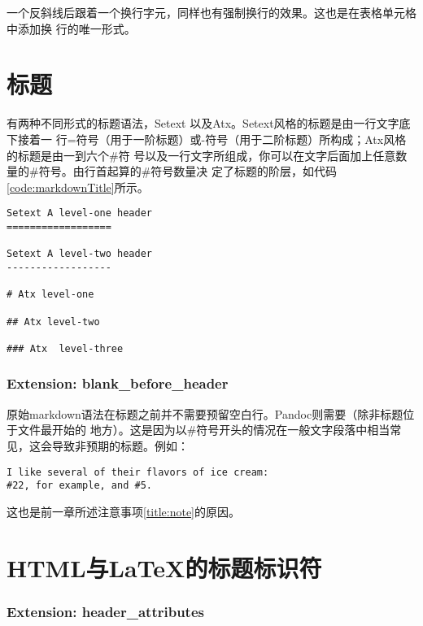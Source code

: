 \documentclass[fancyhdr,bookmark]{ctexbook}
\begin{document}
一个反斜线后跟着一个换行字元，同样也有强制换行的效果。这也是在表格单元格中添加换
行的唯一形式。

\section{标题}\label{ux6807ux9898}

有两种不同形式的标题语法，Setext
以及Atx。Setext风格的标题是由一行文字底下接着一
行=符号（用于一阶标题）或-符号（用于二阶标题）所构成；Atx风格的标题是由一到六个\#符
号以及一行文字所组成，你可以在文字后面加上任意数量的\#符号。由行首起算的\#符号数量决
定了标题的阶层，如代码\ref{code:markdownTitle}所示。

\begin{lstlisting}[label=code:markdownTitle, caption=code:markdownTitle, float=htbp]
Setext A level-one header
==================

Setext A level-two header
------------------

# Atx level-one

## Atx level-two

### Atx  level-three
\end{lstlisting}

\subsubsection{Extension:
blank\_before\_header}\label{extension-blankux5fbeforeux5fheader}

原始markdown语法在标题之前并不需要预留空白行。Pandoc则需要（除非标题位于文件最开始的
地方）。这是因为以\#符号开头的情况在一般文字段落中相当常见，这会导致非预期的标题。例如：

\begin{lstlisting}
I like several of their flavors of ice cream:
#22, for example, and #5.
\end{lstlisting}

这也是前一章所述注意事项\ref{title:note}的原因。

\section{HTML与LaTeX的标题标识符}\label{htmlux4e0elatexux7684ux6807ux9898ux6807ux8bc6ux7b26}

\subsubsection{Extension:
header\_attributes}\label{extension-headerux5fattributes}
\end{document}
